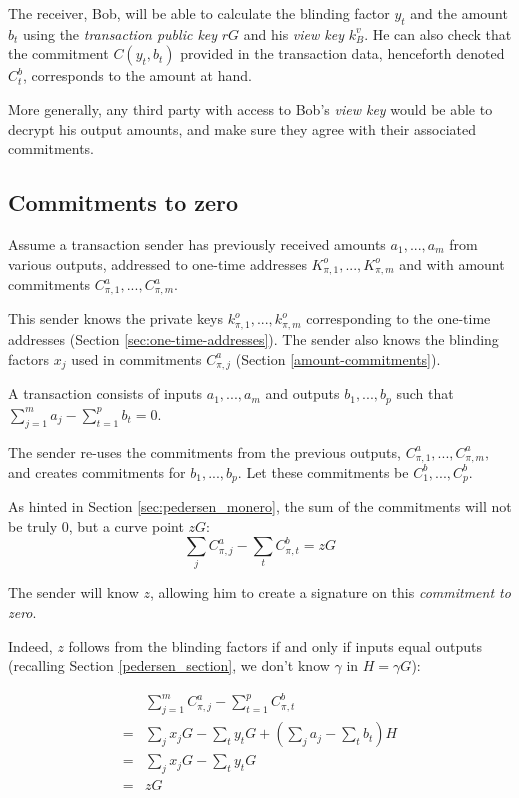 The receiver, Bob, will be able to calculate the blinding factor $y_t$ and the amount $b_t$ using the {\em transaction public key} $r G$ and his {\em view key} $k_B^v$. He can also check that the commitment $C(y_t, b_t)$ provided in the transaction data, henceforth denoted $C_t^b$,  corresponds to the amount at hand.

More generally, any third party with access to Bob’s {\em view key} would be able to decrypt his output amounts, and make sure they agree with their associated commitments.



\subsection{Commitments to zero}
\label{sec:commitments-to-zero}

Assume a transaction sender has previously received amounts $a_1, ..., a_m$ from various outputs, addressed to one-time addresses $K_{\pi,1}^o, ..., K_{\pi,m}^o$ and with amount commitments $C_{\pi,1}^a, ..., C_{\pi,m}^a$.

This sender knows the private keys $k_{\pi,1}^o, ..., k_{\pi,m}^o$ corresponding to the one-time addresses (Section \ref{sec:one-time-addresses}). The sender also knows the blinding factors $x_j$ used in commitments $C_{\pi,j}^a$ (Section \ref{amount-commitments}).

A transaction consists of inputs \(a_1, ..., a_m\) and outputs \(b_1, ..., b_p\) such that \(\sum\limits_{j=1}^m a_j - \sum\limits_{t=1}^p b_t = 0\). 
 
The sender re-uses the commitments from the previous outputs, $C_{\pi,1}^a, ..., C_{\pi,m}^a,$ and creates commitments for $b_1, ..., b_p$. Let these commitments be $C_1^b, ..., C_p^b$.

As hinted in Section \ref{sec:pedersen_monero}, the sum of the commitments will not be truly 0, but a curve point $z G$:\\
\[\sum\limits_j C^a_{\pi, j} -\sum\limits_t C^b_{\pi, t} = z G  \]

The sender will know $z$, allowing him to create a signature on this {\em commitment to zero}. 

Indeed, $z$ follows from the blinding factors if and only if inputs equal outputs (recalling Section \ref{pedersen_section}, we don’t know $\gamma$ in $H = \gamma G$):


\begin{align*}
& \sum\limits_{j=1}^m C^a_{\pi, j} - \sum\limits_{t=1}^p C^b_{\pi, t} \\
= & \sum\limits_j x_j G - \sum\limits_t y_t G + (\sum\limits_j  a_j - \sum\limits_t  b_t) H\\
= & \sum\limits_j x_j G - \sum\limits_t y_t G \\
= & z G
\end{align*}




